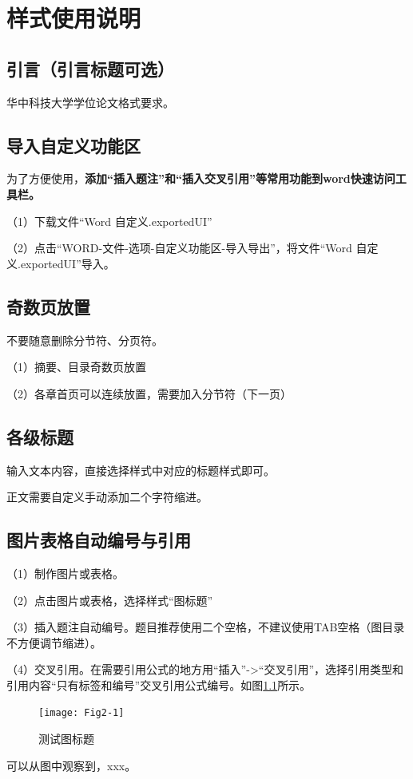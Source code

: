 

\chapter{样式使用说明}
\label{cha:command}


\section{引言（引言标题可选）}
\label{sec:cover}
华中科技大学学位论文格式要求。

\section{导入自定义功能区}
为了方便使用，\textbf{添加“插入题注”和“插入交叉引用”等常用功能到word快速访问工具栏。}

（1）下载文件“Word 自定义.exportedUI”

（2）点击“WORD-文件-选项-自定义功能区-导入导出”，将文件“Word 自定义.exportedUI”导入。


\section{奇数页放置}
不要随意删除分节符、分页符。

（1）摘要、目录奇数页放置

（2）各章首页可以连续放置，需要加入分节符（下一页）

\section{各级标题}
输入文本内容，直接选择样式中对应的标题样式即可。

正文需要自定义手动添加二个字符缩进。


\section{图片表格自动编号与引用}
（1）制作图片或表格。

（2）点击图片或表格，选择样式“图标题”

（3）插入题注自动编号。题目推荐使用二个空格，不建议使用TAB空格（图目录不方便调节缩进）。

（4）交叉引用。在需要引用公式的地方用“插入”->“交叉引用”，选择引用类型和引用内容“只有标签和编号”交叉引用公式编号。如图\ref{Fig2_1}所示。

\begin{figure}[!htbp]
    \centering
    \texttt{[image: Fig2-1]}
    \caption{测试图标题}
    \label{Fig2_1}
\end{figure}
可以从图中观察到，xxx。

